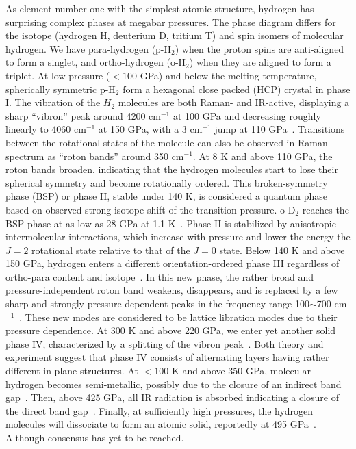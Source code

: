 As element number one with the simplest atomic structure, hydrogen has surprising complex phases at megabar pressures.
The phase diagram differs for the isotope (hydrogen H, deuterium D, tritium T) and spin isomers of molecular hydrogen.
We have para-hydrogen (p-H$_2$) when the proton spins are anti-aligned to form a singlet, and ortho-hydrogen (o-H$_2$) when they are aligned to form a triplet.
At low pressure ($<100$ GPa) and below the melting temperature, spherically symmetric p-H$_2$ form a hexagonal close packed (HCP) crystal in phase I.
The vibration of the $H_2$ molecules are both Raman- and IR-active, displaying a sharp ``vibron'' peak around 4200 cm$^{-1}$ at 100 GPa and decreasing roughly linearly to 4060 cm$^{-1}$ at 150 GPa, with a 3 cm$^{-1}$ jump at 110 GPa~\cite{Lorenzana1990}.
Transitions between the rotational states of the molecule can also be observed in Raman spectrum as ``roton bands'' around 350 cm$^{-1}$. At 8 K and above 110 GPa, the roton bands broaden, indicating that the hydrogen molecules start to lose their spherical symmetry and become rotationally ordered. This broken-symmetry phase (BSP) or phase II, stable under 140 K, is considered a quantum phase based on observed strong isotope shift of the transition pressure. o-D$_2$ reaches the BSP phase at as low as 28 GPa at 1.1 K~\cite{Silvera1981}.
Phase II is stabilized by anisotropic intermolecular interactions, which increase with pressure and lower the energy the $J=2$ rotational state relative to that of the $J=0$ state.
Below 140 K and above 150 GPa, hydrogen enters a different orientation-ordered phase III regardless of ortho-para content and isotope~\cite{Cui1995,Goncharov1998}.
In this new phase, the rather broad and pressure-independent roton band weakens, disappears, and is replaced by a few sharp and strongly pressure-dependent peaks in the frequency range 100$\sim$700 cm$^{-1}$~\cite{Goncharov1998}.
These new modes are considered to be lattice libration modes due to their pressure dependence.
At 300 K and above 220 GPa, we enter yet another solid phase IV, characterized by a splitting of the vibron peak~\cite{Zha2013}.
Both theory and experiment suggest that phase IV consists of alternating layers having rather different in-plane structures.
At $<100$ K and above 350 GPa, molecular hydrogen becomes semi-metallic, possibly due to the closure of an indirect band gap~\cite{Eremets2019}.
Then, above 425 GPa, all IR radiation is absorbed indicating a closure of the direct band gap~\cite{Loubeyre2020}.
Finally, at sufficiently high pressures, the hydrogen molecules will dissociate to form an atomic solid, reportedly at 495 GPa~\cite{Silvera2017}. Although consensus has yet to be reached.

